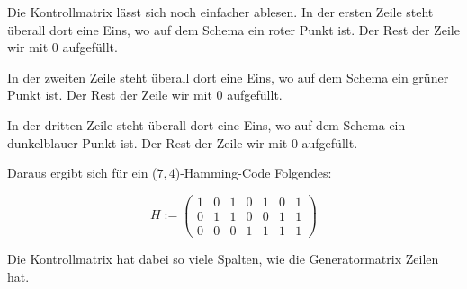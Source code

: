 \documentclass[10pt,a4paper,oneside,ngerman,numbers=noenddot]{scrartcl}
\begin{document}
Die Kontrollmatrix lässt sich noch einfacher ablesen. In der ersten Zeile steht überall dort eine Eins, wo auf dem Schema ein roter Punkt ist. Der Rest der Zeile wir mit 0 aufgefüllt.

In der zweiten Zeile steht überall dort eine Eins, wo auf dem Schema ein grüner Punkt ist. Der Rest der Zeile wir mit 0 aufgefüllt.

In der dritten Zeile steht überall dort eine Eins, wo auf dem Schema ein dunkelblauer Punkt ist. Der Rest der Zeile wir mit 0 aufgefüllt.

Daraus ergibt sich für ein ($7,4$)-Hamming-Code Folgendes:

\begin{equation*}
H := \begin{pmatrix} 1 & 0 & 1 & 0 & 1 & 0 & 1 \\ 0 & 1 & 1 & 0 & 0 & 1 & 1 \\ 0 & 0 & 0 & 1 & 1 & 1 & 1 \end{pmatrix}
\end{equation*}

Die Kontrollmatrix hat dabei so viele Spalten, wie die Generatormatrix Zeilen hat.
\end{document}
